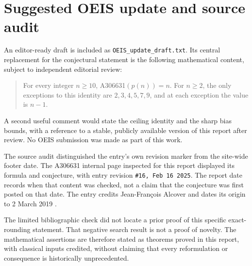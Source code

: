 \documentclass[11pt]{article}
\numberwithin{equation}{section}
\theoremstyle{definition}
\theoremstyle{remark}
\begin{document}
\section{Suggested OEIS update and source audit}\label{app:oeis}
An editor-ready draft is included as \texttt{OEIS\_update\_draft.txt}.
Its central replacement for the conjectural statement is the following
mathematical content, subject to independent editorial review:
\begin{quote}
For every integer $n\ge10$, A306631$(p(n))=n$. For $n\ge2$, the only
exceptions to this identity are $2,3,4,5,7,9$, and at each exception the
value is $n-1$.
\end{quote}
A second useful comment would state the ceiling identity and the sharp
bias bounds, with a reference to a stable, publicly available version
of this report after review. No OEIS submission was made as part of
this work.

The source audit distinguished the entry's own revision marker from
the site-wide footer date. The A306631 internal page inspected for this
report displayed its formula and conjecture, with entry revision
\texttt{\#16, Feb 16 2025}. The report date records when that content was
checked, not a claim that the conjecture was first posted on that date.
The entry credits Jean-Fran\c{c}ois Alcover and dates its origin to
2 March 2019 \cite{oeis306631}.

The limited bibliographic check did not locate a prior proof of this
specific exact-rounding statement. That negative search result is not
a proof of novelty. The mathematical assertions are therefore stated
as theorems proved in this report, with classical inputs credited,
without claiming that every reformulation or consequence is
historically unprecedented.
\end{document}
